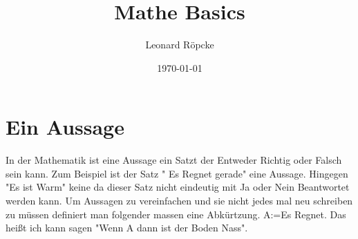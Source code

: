 \documentclass[12pt,a4paper]{article}
\title{Mathe Basics}
\author{Leonard Röpcke}
\date{\today}
\begin{document}
\maketitle
\tableofcontents
\newpage

\section{Ein Aussage}
In der Mathematik ist eine Aussage ein Satzt der Entweder Richtig oder Falsch sein kann. Zum Beispiel ist der Satz " Es Regnet gerade" eine Aussage.
Hingegen "Es ist Warm" keine da dieser Satz nicht eindeutig mit Ja oder Nein Beantwortet werden kann.
Um Aussagen zu vereinfachen und sie nicht jedes mal neu schreiben zu müssen definiert man folgender massen eine Abkürtzung. A:=Es Regnet.
Das heißt ich kann sagen "Wenn A dann ist der Boden Nass".
\end{document}
